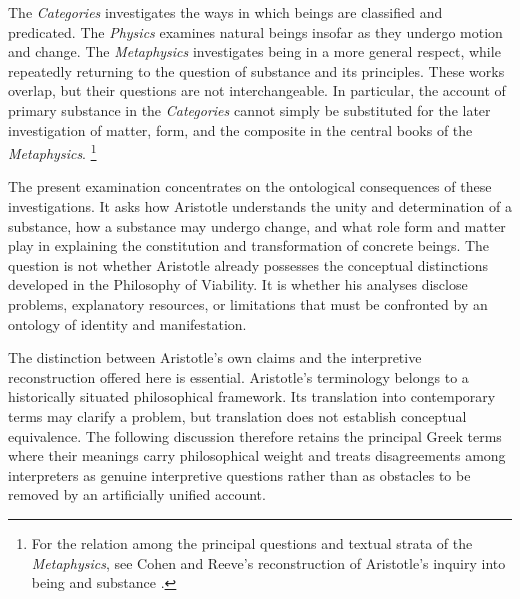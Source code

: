 \label{para:VS.B01.P01.C08.S05.SS01.P002}

The \textit{Categories} investigates the ways in which beings
are classified and predicated. The \textit{Physics} examines
natural beings insofar as they undergo motion and change.
The \textit{Metaphysics} investigates being in a more general
respect, while repeatedly returning to the question of substance
and its principles. These works overlap, but their questions
are not interchangeable. In particular, the account of primary
substance in the \textit{Categories} cannot simply be substituted
for the later investigation of matter, form, and the composite
in the central books of the \textit{Metaphysics}. \footnote{For
the relation among the principal questions and textual strata
of the \textit{Metaphysics}, see Cohen and Reeve's reconstruction
of Aristotle's inquiry into being and substance
\cite{CohenReeveAristotleMetaphysics2025}.}

\label{para:VS.B01.P01.C08.S05.SS01.P003}

The present examination concentrates on the ontological
consequences of these investigations. It asks how Aristotle
understands the unity and determination of a substance, how
a substance may undergo change, and what role form and matter
play in explaining the constitution and transformation of
concrete beings. The question is not whether Aristotle already
possesses the conceptual distinctions developed in the
Philosophy of Viability. It is whether his analyses disclose
problems, explanatory resources, or limitations that must
be confronted by an ontology of identity and manifestation.

\label{para:VS.B01.P01.C08.S05.SS01.P004}

The distinction between Aristotle's own claims and the
interpretive reconstruction offered here is essential.
Aristotle's terminology belongs to a historically situated
philosophical framework. Its translation into contemporary
terms may clarify a problem, but translation does not establish
conceptual equivalence. The following discussion therefore
retains the principal Greek terms where their meanings carry
philosophical weight and treats disagreements among interpreters
as genuine interpretive questions rather than as obstacles
to be removed by an artificially unified account.


